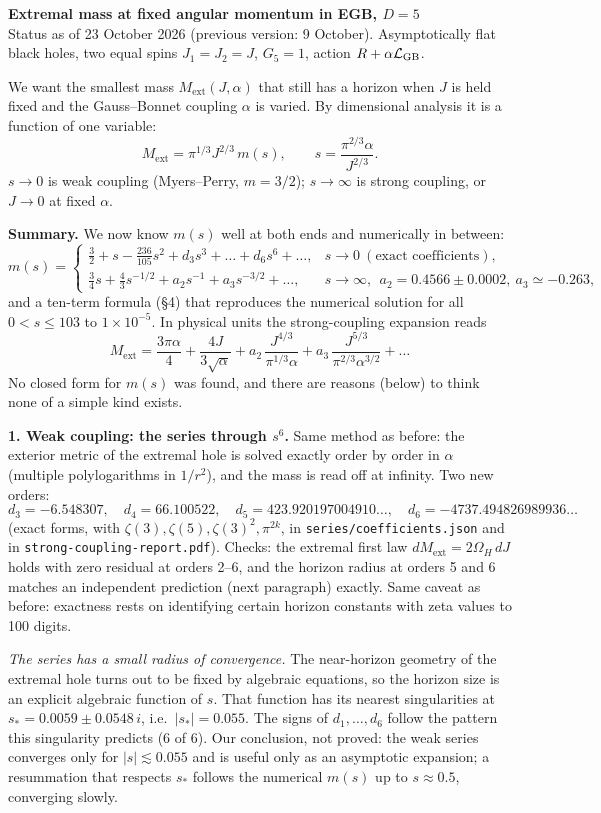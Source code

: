 \documentclass[10pt,a4paper]{article}
\newcommand{\ext}{\mathrm{ext}}
\begin{document}
{\large\bfseries Extremal mass at fixed angular momentum in EGB, $D=5$}\\[1pt]
{\small Status as of 23 October 2026 (previous version: 9 October). Asymptotically flat black holes, two equal
spins $J_1=J_2=J$, $G_5=1$, action $R+\alpha\mathcal L_{\rm GB}$.}

\medskip
We want the smallest mass $M_\ext(J,\alpha)$ that still has a horizon when $J$ is held fixed and the
Gauss--Bonnet coupling $\alpha$ is varied. By dimensional analysis it is a function of one variable:
\[
M_\ext=\pi^{1/3}J^{2/3}\,m(s),\qquad s=\frac{\pi^{2/3}\alpha}{J^{2/3}} .
\]
$s\to0$ is weak coupling (Myers--Perry, $m=3/2$); $s\to\infty$ is strong coupling, or $J\to0$ at fixed $\alpha$.

\textbf{Summary.} We now know $m(s)$ well at both ends and numerically in between:
\[
m(s)=\begin{cases}
\tfrac32+s-\tfrac{236}{105}s^2+d_3s^3+\dots+d_6s^6+\dots, & s\to0 \ (\text{exact coefficients}),\\[3pt]
\tfrac34 s+\tfrac43 s^{-1/2}+a_2s^{-1}+a_3s^{-3/2}+\dots, & s\to\infty,\ \ a_2=0.4566\pm0.0002,\ a_3\simeq-0.263,
\end{cases}
\]
and a ten-term formula (\S4) that reproduces the numerical solution for all $0<s\le103$ to $1\times10^{-5}$.
In physical units the strong-coupling expansion reads
\[
M_\ext=\frac{3\pi\alpha}{4}+\frac{4J}{3\sqrt\alpha}+a_2\,\frac{J^{4/3}}{\pi^{1/3}\alpha}
+a_3\,\frac{J^{5/3}}{\pi^{2/3}\alpha^{3/2}}+\dots
\]
No closed form for $m(s)$ was found, and there are reasons (below) to think none of a simple kind exists.

\textbf{1. Weak coupling: the series through $s^6$.} Same method as before: the exterior metric of the
extremal hole is solved exactly order by order in $\alpha$ (multiple polylogarithms in $1/r^2$), and the mass
is read off at infinity. Two new orders:
\[
d_3=-6.548307,\quad d_4=66.100522,\quad d_5=423.920197004910\ldots,\quad d_6=-4737.494826989936\ldots
\]
(exact forms, with $\zeta(3),\zeta(5),\zeta(3)^2,\pi^{2k}$, in \texttt{series/coefficients.json} and in
\texttt{strong-coupling-report.pdf}). Checks: the extremal first law $dM_\ext=2\Omega_H\,dJ$ holds with zero
residual at orders 2--6, and the horizon radius at orders 5 and 6 matches an independent prediction (next
paragraph) exactly. Same caveat as before: exactness rests on identifying certain horizon constants with
zeta values to 100 digits.

\emph{The series has a small radius of convergence.} The near-horizon geometry of the extremal hole turns
out to be fixed by algebraic equations, so the horizon size is an explicit algebraic function of $s$.
That function has its nearest singularities at $s_*=0.0059\pm0.0548\,i$, i.e.\ $|s_*|=0.055$. The signs of
$d_1,\dots,d_6$ follow the pattern this singularity predicts (6 of 6). Our conclusion, not proved: the weak
series converges only for $|s|\lesssim0.055$ and is useful only as an asymptotic expansion; a resummation
that respects $s_*$ follows the numerical $m(s)$ up to $s\approx0.5$, converging slowly.
\end{document}
